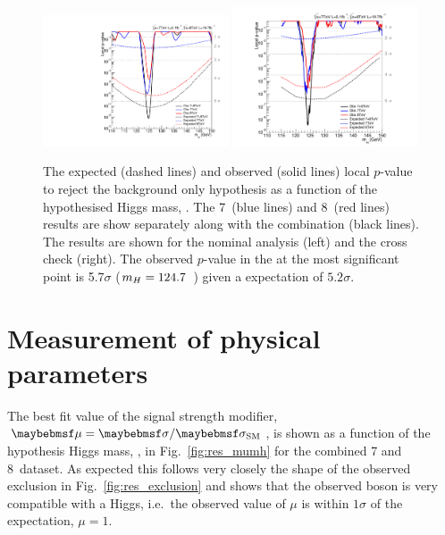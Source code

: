 \begin{figure}
  \includegraphics[width=0.49\textwidth]{results/plots/mva_pval.pdf}
  \includegraphics[width=0.49\textwidth]{results/plots/sideband_pval_fix.pdf}
  \caption[The expected and observed local $p$-value to reject the background hypothesis]{The expected (dashed lines) and observed (solid lines) local $p$-value to reject the background only hypothesis as a function of the hypothesised Higgs mass, \mH. The 7~\TeV (blue lines) and 8~\TeV (red lines) results are show separately along with the combination (black lines). The results are shown for the nominal \MFM analysis (left) and the cross check \SMVA (right). The observed $p$-value in the \MFM at the most significant point is 5.7$\sigma$ ($m_{H}=124.7$~\GeV) given a \SM expectation of $5.2\sigma$.}
  \label{fig:res_pvalue}
\end{figure}

\section{Measurement of physical parameters}

The best fit value of the signal strength modifier, $\mu=\musm$, is shown as a function of the hypothesis Higgs mass, \mH, in Fig.~\ref{fig:res_mumh} for the combined 7 and 8~\TeV dataset. As expected this follows very closely the shape of the observed exclusion in Fig.~\ref{fig:res_exclusion} and shows that the observed boson is very compatible with a \SM Higgs, i.e.~the observed value of $\mu$ is within $1\sigma$ of the \SM expectation, $\mu=1$. 

